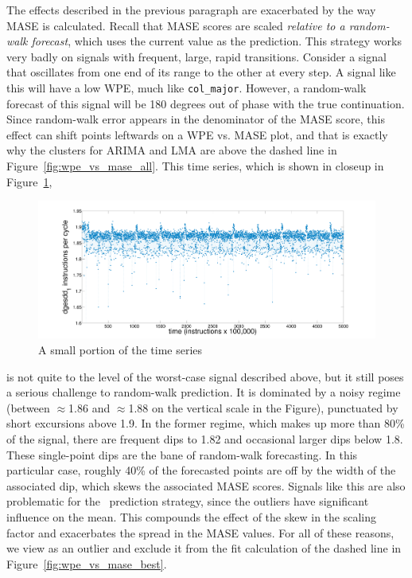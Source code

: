The effects described in the previous paragraph are exacerbated by the
way MASE is calculated.  Recall that MASE scores are scaled
\emph{relative to a random-walk forecast}, which uses the current
value as the prediction.  This strategy works very badly on signals
with frequent, large, rapid transitions.  Consider a signal that
oscillates from one end of its range to the other at every step.  A
signal like this will have a low WPE, much like {\tt col\_major}.
However, a random-walk forecast of this signal will be 180 degrees out
of phase with the true continuation.  Since random-walk error appears
in the denominator of the MASE score, this effect can shift points
leftwards on a WPE vs. MASE plot, and that is exactly why the
\svdone clusters for ARIMA and LMA are above the dashed line in
Figure~\ref{fig:wpe_vs_mase_all}.  This time series, which is shown in
closeup in Figure~\ref{fig:svdone-ts},
\begin{figure}[htbp]
  \centering
    \includegraphics[width=\columnwidth]{figs/svdonets2}
\caption{A small portion of the \svdone time series}\label{fig:svdone-ts}
\end{figure} 
is not quite to the level of the worst-case signal described above,
but it still poses a serious challenge to random-walk prediction.  It
is dominated by a noisy regime (between $\approx$1.86 and
$\approx$1.88 on the vertical scale in the Figure), punctuated by
short excursions above 1.9.  In the former regime, which makes up more
than 80\% of the signal, there are frequent dips to 1.82 and
occasional larger dips below 1.8.  These single-point dips are the
bane of random-walk forecasting.  In this particular case, roughly
40\% of the forecasted points are off by the width of the associated
dip, which skews the associated MASE scores.  Signals like this are
also problematic for the \naive ~prediction strategy, since the
outliers have significant influence on the mean.  This compounds the
effect of the skew in the scaling factor and exacerbates the spread in
the \svdone MASE values.  For all of these reasons, we view \svdone
as an outlier and exclude it from the fit calculation of the dashed
line in Figure~\ref{fig:wpe_vs_mase_best}.

